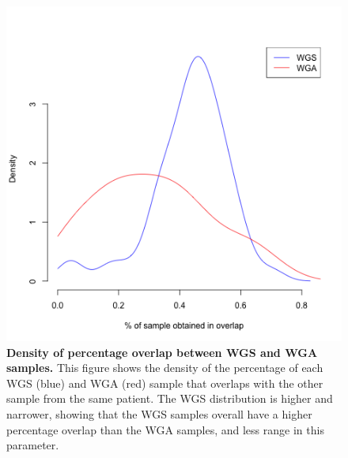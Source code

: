 \documentclass[11pt]{article} %
\begin{document}
\begin{figure}
\includegraphics[scale=1.0]{unfiltered_overlap_WGS_WGA_together_densities.png}
\caption{\textbf{Density of percentage overlap between WGS and WGA samples.} This figure shows the density of the percentage of each WGS (blue) and WGA (red) sample that overlaps with the other sample from the same patient. The WGS distribution is higher and narrower, showing that the WGS samples overall have a higher percentage overlap than the WGA samples, and less range in this parameter. }
\end{figure}
\end{document}
